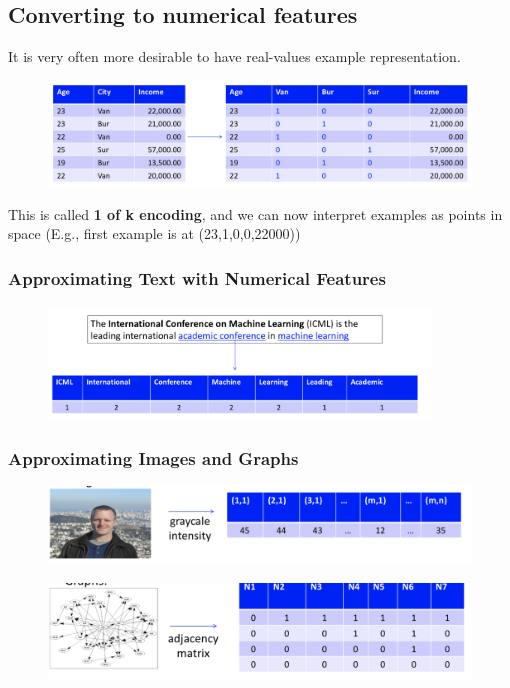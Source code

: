 \documentclass{article}
\begin{document}
\subsection*{Converting to numerical features}
It is very often more desirable to have real-values example representation.
\begin{figure}[H]
	\centering
	\includegraphics[width = 6in]{Pic1}
\end{figure}
\noindent This is called {\bf 1 of k encoding}, and we can now interpret examples as points in space (E.g., first example is at (23,1,0,0,22000))
\subsubsection*{Approximating Text with Numerical Features}
\begin{figure}[H]
	\centering
	\includegraphics[width = 4in]{Pic2}
\end{figure}

\subsubsection*{Approximating Images and Graphs}
\begin{figure}[H]
	\centering
	\includegraphics[width = 5in]{Pic3}
\end{figure}
\begin{figure}[H]
	\centering
	\includegraphics[width = 5in]{Pic4}
\end{figure}
\end{document}
